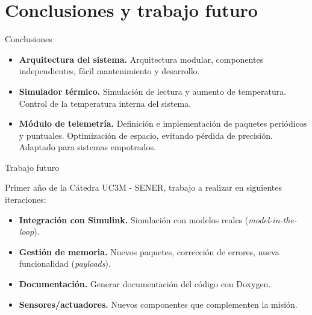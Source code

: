 \section{Conclusiones y trabajo futuro}


\begin{frame}{Conclusiones}

\begin{itemize}[<+->]
\item \textbf{Arquitectura del sistema.} Arquitectura modular, componentes independientes, fácil mantenimiento y desarrollo.
\item \textbf{Simulador térmico.} Simulación de lectura y aumento de temperatura. Control de la temperatura interna del sistema.
\item \textbf{Módulo de telemetría.} Definición e implementación de paquetes periódicos y puntuales. Optimización de espacio, evitando pérdida de precisión. Adaptado para sistemas empotrados.

\end{itemize}

\end{frame}



\begin{frame}{Trabajo futuro}

Primer año de la Cátedra UC3M - SENER, trabajo a realizar en siguientes iteraciones:

\begin{itemize}
\item \textbf{Integración con Simulink.} Simulación con modelos reales (\emph{model-in-the-loop}).
\item \textbf{Gestión de memoria.} Nuevos paquetes, corrección de errores, nueva funcionalidad (\emph{payloads}).
\item \textbf{Documentación.} Generar documentación del código con Doxygen.
\item \textbf{Sensores/actuadores.} Nuevos componentes que complementen la misión.
\end{itemize}

\end{frame}